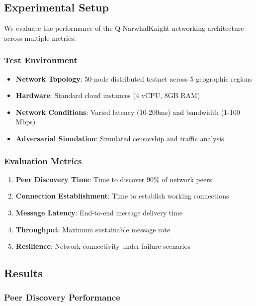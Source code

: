 \documentclass[11pt,a4paper]{article}
\theoremstyle{definition}
\theoremstyle{remark}
\begin{document}
\subsection{Experimental Setup}

We evaluate the performance of the Q-NarwhalKnight networking architecture across multiple metrics:

\subsubsection{Test Environment}

\begin{itemize}
    \item \textbf{Network Topology}: 50-node distributed testnet across 5 geographic regions
    \item \textbf{Hardware}: Standard cloud instances (4 vCPU, 8GB RAM)
    \item \textbf{Network Conditions}: Varied latency (10-200ms) and bandwidth (1-100 Mbps)
    \item \textbf{Adversarial Simulation}: Simulated censorship and traffic analysis
\end{itemize}

\subsubsection{Evaluation Metrics}

\begin{enumerate}
    \item \textbf{Peer Discovery Time}: Time to discover 90\% of network peers
    \item \textbf{Connection Establishment}: Time to establish working connections
    \item \textbf{Message Latency}: End-to-end message delivery time
    \item \textbf{Throughput}: Maximum sustainable message rate
    \item \textbf{Resilience}: Network connectivity under failure scenarios
\end{enumerate}

\subsection{Results}

\subsubsection{Peer Discovery Performance}
\end{document}

